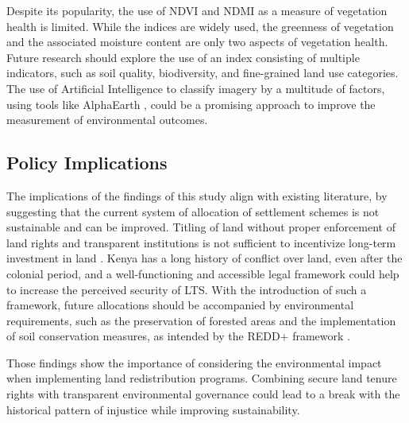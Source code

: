 Despite its popularity, the use of NDVI and NDMI as a measure of vegetation health is limited.
While the indices are widely used, the greenness of vegetation and the associated moisture content are only two aspects of vegetation health.
Future research should explore the use of an index consisting of multiple indicators, such as soil quality, biodiversity, and fine-grained land use categories.
The use of Artificial Intelligence to classify imagery by a multitude of factors, using tools like AlphaEarth \parencite{brownAlphaEarthFoundationsEmbedding2025}, could be a promising approach to improve the measurement of environmental outcomes.

\subsection{Policy Implications}
The implications of the findings of this study align with existing literature, by suggesting that the current system of allocation of settlement schemes is not sustainable and can be improved.
Titling of land without proper enforcement of land rights and transparent institutions is not sufficient to incentivize long-term investment in land \parencite{kameri-mboteLandTenureLand2006}.
Kenya has a long history of conflict over land, even after the colonial period, and a well-functioning and accessible legal framework could help to increase the perceived security of LTS.
With the introduction of such a framework, future allocations should be accompanied by environmental requirements, such as the preservation of forested areas and the implementation of soil conservation measures, as intended by the REDD+ framework \parencite{naughton-trevesLandTenureTropical2014,pearsonGreenhouseGasEmissions2017,hosonumaAssessmentDeforestationForest2012}.

Those findings show the importance of considering the environmental impact when implementing land redistribution programs.
Combining secure land tenure rights with transparent environmental governance could lead to a break with the historical pattern of injustice while improving sustainability.